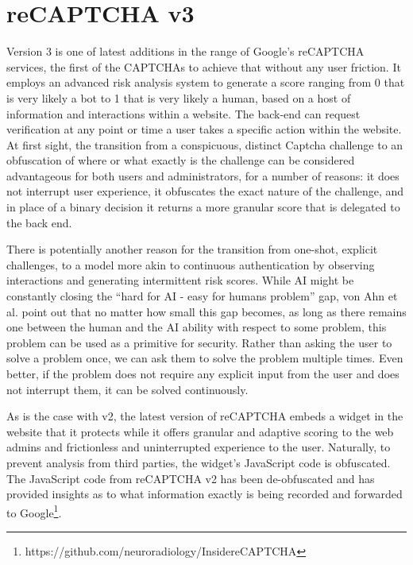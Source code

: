 \section{reCAPTCHA v3}
\label{sec:recap}

Version 3 is one of latest additions in the range of Google's reCAPTCHA services, the first of the CAPTCHAs to achieve that without any user friction.
It employs an advanced risk analysis system to generate a score ranging from 0 that is very likely a bot to 1 that is very likely a human, based on a host of information and interactions within a website.
The back-end can request verification at any point or time a user takes a specific action within the website.
At first sight, the transition from a conspicuous, distinct Captcha challenge to an obfuscation of where or what exactly is the challenge can be considered advantageous for both users and administrators, for a number of reasons: it does not interrupt user experience, it obfuscates the exact nature of the challenge, and in place of a binary decision it returns a more granular score that is delegated to the back end.

There is potentially another reason for the transition from one-shot, explicit challenges, to a model more akin to continuous authentication by observing interactions and generating intermittent risk scores.
While AI might be constantly closing the ``hard for AI - easy for humans problem'' gap, von Ahn et al. \cite{von2003captcha} point out that no matter how small this gap becomes, as long as there remains one between the human and the AI ability with respect to some problem, this problem can be used as a primitive for security.
Rather than asking the user to solve a problem once, we can ask them to solve the problem multiple times.
Even better, if the problem does not require any explicit input from the user and does not interrupt them, it can be solved continuously.

As is the case with v2, the latest version of reCAPTCHA embeds a widget in the website that it protects while it offers granular and adaptive scoring to the web admins and frictionless and uninterrupted experience to the user.
Naturally, to prevent analysis from third parties, the widget's JavaScript code is obfuscated.
The JavaScript code from reCAPTCHA v2 has been de-obfuscated and has provided insights as to what information exactly is being recorded and forwarded to Google\footnote{https://github.com/neuroradiology/InsidereCAPTCHA}.


